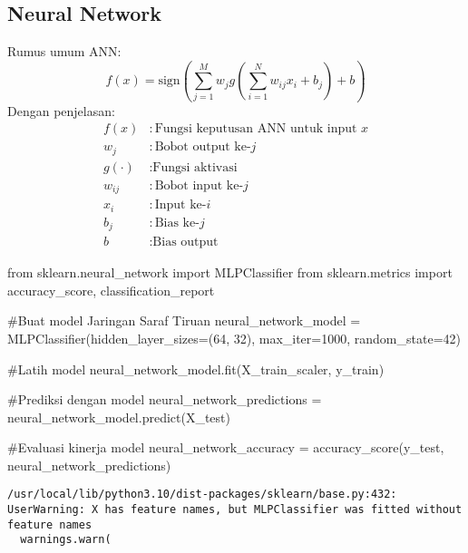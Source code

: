\documentclass[
  letterpaper,
]{krantz}
\makeatletter
\newenvironment{Shaded}{\begin{snugshade}}{\end{snugshade}}
\newcommand{\CommentTok}[1]{\textcolor[rgb]{0.37,0.37,0.37}{#1}}
\newcommand{\DecValTok}[1]{\textcolor[rgb]{0.68,0.00,0.00}{#1}}
\newcommand{\ImportTok}[1]{\textcolor[rgb]{0.00,0.46,0.62}{#1}}
\newcommand{\NormalTok}[1]{\textcolor[rgb]{0.00,0.23,0.31}{#1}}
\newcommand{\OperatorTok}[1]{\textcolor[rgb]{0.37,0.37,0.37}{#1}}
\newenvironment{kframe}{%
\medskip{}
\setlength{\fboxsep}{.8em}
 \def\at@end@of@kframe{}%
 \ifinner\ifhmode%
  \def\at@end@of@kframe{\end{minipage}}%
  \begin{minipage}{\columnwidth}%
 \fi\fi%
 \def\FrameCommand##1{\hskip\@totalleftmargin \hskip-\fboxsep
 \colorbox{shadecolor}{##1}\hskip-\fboxsep
     \hskip-\linewidth \hskip-\@totalleftmargin \hskip\columnwidth}%
 \MakeFramed {\advance\hsize-\width
   \@totalleftmargin\z@ \linewidth\hsize
   \@setminipage}}%
 {\par\unskip\endMakeFramed%
 \at@end@of@kframe}
\renewenvironment{Shaded}{\begin{kframe}}{\end{kframe}}
\makeatother
\begin{document}
\hypertarget{neural-network}{%
\subsection{Neural Network}\label{neural-network}}

Rumus umum ANN: \[
f(x) = \text{sign}\left(\sum_{j=1}^{M} w_j g\left(\sum_{i=1}^{N} w_{ij} x_i + b_j\right) + b\right)
\] Dengan penjelasan: \[
\begin{align*}
f(x) & : \text{Fungsi keputusan ANN untuk input } x \\
w_j & : \text{Bobot output ke-} j \\
g(\cdot) & : \text{Fungsi aktivasi} \\
w_{ij} & : \text{Bobot input ke-} j \\
x_i & : \text{Input ke-} i \\
b_j & : \text{Bias ke-} j \\
b & : \text{Bias output}
\end{align*}
\]

\begin{Shaded}
\begin{Highlighting}[]
\ImportTok{from}\NormalTok{ sklearn.neural\_network }\ImportTok{import}\NormalTok{ MLPClassifier}
\ImportTok{from}\NormalTok{ sklearn.metrics }\ImportTok{import}\NormalTok{ accuracy\_score, classification\_report}

\CommentTok{\#Buat model Jaringan Saraf Tiruan}
\NormalTok{neural\_network\_model }\OperatorTok{=}\NormalTok{ MLPClassifier(hidden\_layer\_sizes}\OperatorTok{=}\NormalTok{(}\DecValTok{64}\NormalTok{, }\DecValTok{32}\NormalTok{), max\_iter}\OperatorTok{=}\DecValTok{1000}\NormalTok{, random\_state}\OperatorTok{=}\DecValTok{42}\NormalTok{)}

\CommentTok{\#Latih model}
\NormalTok{neural\_network\_model.fit(X\_train\_scaler, y\_train)}

\CommentTok{\#Prediksi dengan model}
\NormalTok{neural\_network\_predictions }\OperatorTok{=}\NormalTok{ neural\_network\_model.predict(X\_test)}

\CommentTok{\#Evaluasi kinerja model}
\NormalTok{neural\_network\_accuracy }\OperatorTok{=}\NormalTok{ accuracy\_score(y\_test, neural\_network\_predictions)}
\end{Highlighting}
\end{Shaded}

\begin{verbatim}
/usr/local/lib/python3.10/dist-packages/sklearn/base.py:432: UserWarning: X has feature names, but MLPClassifier was fitted without feature names
  warnings.warn(
\end{verbatim}
\end{document}
